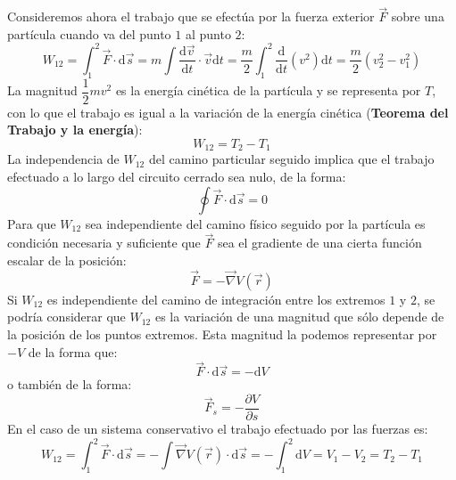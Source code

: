 \documentclass[../main]{subfiles}
\begin{document}
    \vspace{0.2cm}
    
Consideremos ahora el trabajo que se efectúa por la fuerza exterior $\vec{F}$ sobre una partícula cuando va del punto $1$ al punto $2$:
    \begin{equation}
        W_{12}=\int_1^2 \vec{F} \cdot \text{d} \vec{s}=m \int \dfrac{\text{d}\vec{v}}{\text{d}t}\cdot \vec{v} \text{d}t=\dfrac{m}{2}\int_1^2 \dfrac{\text{d}}{\text{d}t}(v^2) \text{d}t=\dfrac{m}{2}\left( v_2^2-v_1^2\right)
        \label{eq7}
    \end{equation}
La magnitud $\dfrac{1}{2}mv^2$ es la energía cinética de la partícula y se representa por $T$, con lo que el trabajo es igual a la variación de la energía cinética (\textbf{Teorema del Trabajo y la energía}):
    \begin{equation}
        W_{12}=T_2-T_1
        \label{eq8}
    \end{equation}
La independencia de $W_{12}$ del camino particular seguido implica que el trabajo efectuado a lo largo del circuito cerrado sea nulo, de la forma:
    \begin{equation}
        \oint \vec{F} \cdot \text{d}\vec{s}=0
        \label{eq9}
    \end{equation}
Para que $W_{12}$ sea independiente del camino físico seguido por la partícula es condición necesaria y suficiente que $\vec{F}$ sea el gradiente de una cierta función escalar de la posición:
    \begin{equation}
        \vec{F}=-\vec{\nabla} V(\vec{r})
        \label{eq10}
    \end{equation}
Si $W_{12}$ es independiente del camino de integración entre los extremos $1$ y $2$, se podría considerar que $W_{12}$ es la variación de una magnitud que sólo depende de la posición de los puntos extremos. Esta magnitud la podemos representar por $-V$ de la forma que:
    \begin{equation*}
        \vec{F}\cdot \text{d}\vec{s}=-\text{d}V
    \end{equation*}
o también de la forma:
    \begin{equation*}
        \vec{F}_s=-\dfrac{\partial V}{\partial s}
    \end{equation*}
En el caso de un sistema conservativo el trabajo efectuado por las fuerzas es:
    \begin{equation}
        W_{12}=\int_1^2 \vec{F} \cdot \text{d}\vec{s}=-\int \vec{\nabla} V(\vec{r}) \cdot \text{d} \vec{s}=-\int_1^2 \text{d}V=V_1-V_2=T_2-T_1
        \label{eq11}
    \end{equation}
\end{document}
